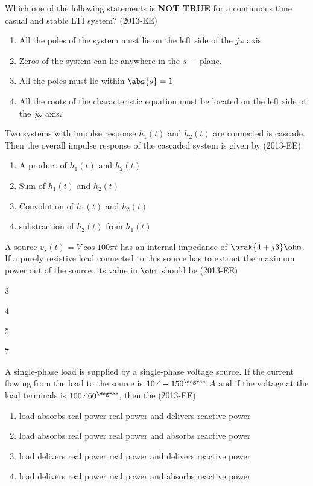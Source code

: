     \item Which one of the following statements is \textbf{NOT TRUE} for a continuous time casual and stable LTI system? \hfill(2013-EE)
    \begin{enumerate}
        \item All the poles of the system must lie on the left side of the $j\omega$ axis
        \item Zeros of the system can lie anywhere in the $s-$ plane.
        \item All the poles must lie within $\abs{s} = 1$
        \item All the roots of the characteristic equation must be located on the left side of the $j\omega$ axis.
    \end{enumerate}
    \item Two systems with impulse response $h_1(t)$ and $h_2(t)$ are connected is cascade. Then the overall impulse response of the cascaded system is given by \hfill(2013-EE)
    \begin{enumerate}
        \item A product of $h_1(t)$ and $h_2(t)$
        \item Sum of $h_1(t)$ and $h_{2}(t)$
        \item Convolution of $h_1(t)$ and $h_2(t)$
        \item substraction of $h_2(t)$ from $h_1(t)$
    \end{enumerate}
    \item A source $v_s(t) = V\cos{100\pi t}$ has an internal impedance of $\brak{4 + j3} \ohm$. If a purely resistive load connected to this source has to extract the maximum power out of the source, its value in $\ohm$ should be \hfill(2013-EE)
    \begin{enumerate}
        \begin{multicols}{4}
            \item 3
            \item 4
            \item 5
            \item 7
        \end{multicols}
    \end{enumerate}
    \item A single-phase load is supplied by a single-phase voltage source. If the current flowing from the load to the source is $10 \angle-150^{\degree}$ $A$ and if the voltage at the load terminals is $100 \angle 60^{\degree}$, then the \hfill(2013-EE)
    \begin{enumerate}
        \item load absorbs real power real power and delivers reactive power
        \item load absorbs real power real power and absorbs reactive power
        \item load delivers real power real power and delivers reactive power
        \item load delivers real power real power and absorbs reactive power
    \end{enumerate}
